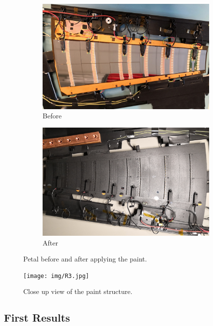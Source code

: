\begin{figure}[h!]
	\centering
	\begin{subfigure}{\textwidth}
		\includegraphics[width=\textwidth]{img/petal.jpg}
		\caption{Before}
		\label{}
	\end{subfigure} \hfill
	\begin{subfigure}{\textwidth}
		\includegraphics[angle=180, width=\textwidth]{img/entire.jpg}
		\caption{After}
		\label{}
	\end{subfigure}
	\caption{Petal before and after applying the paint.}
	\label{fig:petalPreAndPost}
\end{figure}
\begin{figure}[h!]
	\centering
	\texttt{[image: img/R3.jpg]}
	\caption{Close up view of the paint structure.}
	\label{fig:petalCloseUp}
\end{figure}

\subsection{First Results}